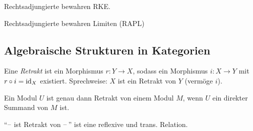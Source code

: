 \documentclass{cheat-sheet}
\DeclareMathOperator{\Quot}{Quot} %
\newenvironment{centertikzcd}
  {\begin{center}\begin{tikzcd}}
  {\end{tikzcd}\end{center}}
\begin{document}
\begin{thm}
  Rechtsadjungierte bewahren RKE.
\end{thm}

\begin{kor}
  Rechtsadjungierte bewahren Limiten (RAPL)
\end{kor}

\iffalse
\begin{bsp}
  Sei $G : \Field \to \Ring$ der Vergissfunktor. Dann ist
  \[ (\Ran_G(G))(R) = \prod_{\mathfrak{p} \subset R} \Quot(R/{\mathfrak{p}}). \]
\end{bsp}
\fi

\subsection{Algebraische Strukturen in Kategorien}

\begin{defn}
  Eine \emph{Retrakt} ist ein Morphismus $r : Y \to X$, sodass ein Morphismus $i : X \to Y$ mit $r \circ i = \operatorname{id}_X$ existiert.
  Sprechweise: $X$ ist ein Retrakt von $Y$ (vermöge $i$).
\end{defn}


\begin{bsp}
  Ein Modul $U$ ist genau dann Retrakt von einem Modul $M$, wenn $U$ ein direkter Summand von $M$ ist.
\end{bsp}

\begin{prop}
  "`$\text{--}$ ist Retrakt von $\text{--}$\,"' ist eine reflexive und trans. Relation.
\end{prop}

\end{document}
